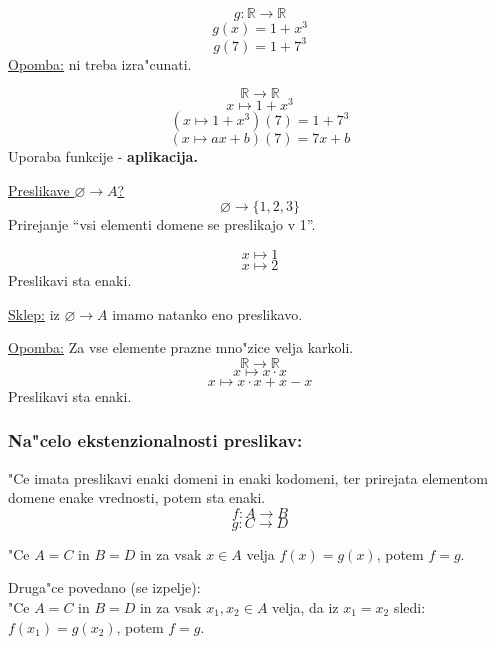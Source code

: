 \[g: \mathbb{R} \rightarrow \mathbb{R}\]
\[g(x) = 1 + x^3\]
\[g(7) = 1 + 7^3\]
\underline{Opomba:} ni treba izra"cunati.

\[\mathbb{R} \rightarrow \mathbb{R}\]
\[x \mapsto 1 + x^3\]
\[(x \mapsto 1 + x^3)(7) = 1 + 7^3\]
\[(x \mapsto ax + b)(7) = 7x + b\]
Uporaba funkcije - \textbf{aplikacija.}

\underline{Preslikave \(\varnothing \rightarrow A\)?}
\[\varnothing \rightarrow \{1, 2, 3\}\]
Prirejanje ``vsi elementi domene se preslikajo v 1''.

\[x \mapsto 1\]
\[x \mapsto 2\]
Preslikavi sta enaki.

\underline{Sklep:} iz \(\varnothing \rightarrow A\) imamo natanko eno preslikavo.

\underline{Opomba:} Za vse elemente prazne mno"zice velja karkoli.
\[\mathbb{R} \rightarrow \mathbb{R}\]
\[x \mapsto x \cdot x\]
\[x \mapsto x \cdot x + x - x\]
Preslikavi sta enaki.

\subsubsection*{Na"celo ekstenzionalnosti preslikav:} "Ce imata preslikavi enaki domeni in enaki kodomeni, ter prirejata elementom domene enake vrednosti, potem sta enaki.
\[f: A \rightarrow B\]
\[g: C \rightarrow D\]

"Ce \(A = C\) in \(B = D\) in za vsak \(x \in A\) velja \(f(x) = g(x)\), potem \(f = g\).

Druga"ce povedano (se izpelje):\\
"Ce \(A = C\) in \(B = D\) in za vsak \(x_1, x_2 \in A\) velja, da iz \(x_1 = x_2\) sledi: \(f(x_1) = g(x_2)\), potem \(f = g\).
